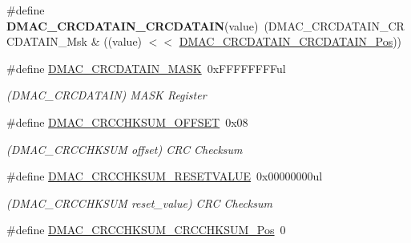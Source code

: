 \begin{DoxyCompactItemize}
\item 
\hypertarget{group___s_a_m_l21___d_m_a_c_ga6f7623c362034eb08c455c14471223a3}{}\#define {\bfseries D\+M\+A\+C\+\_\+\+C\+R\+C\+D\+A\+T\+A\+I\+N\+\_\+\+C\+R\+C\+D\+A\+T\+A\+I\+N}(value)~(D\+M\+A\+C\+\_\+\+C\+R\+C\+D\+A\+T\+A\+I\+N\+\_\+\+C\+R\+C\+D\+A\+T\+A\+I\+N\+\_\+\+Msk \& ((value) $<$$<$ \hyperlink{group___s_a_m_l21___d_m_a_c_ga2713a15a580d2050de8cc774fdd40e3d}{D\+M\+A\+C\+\_\+\+C\+R\+C\+D\+A\+T\+A\+I\+N\+\_\+\+C\+R\+C\+D\+A\+T\+A\+I\+N\+\_\+\+Pos}))\label{group___s_a_m_l21___d_m_a_c_ga6f7623c362034eb08c455c14471223a3}

\item 
\hypertarget{group___s_a_m_l21___d_m_a_c_ga6900758cea6fa34414c3928274381515}{}\#define \hyperlink{group___s_a_m_l21___d_m_a_c_ga6900758cea6fa34414c3928274381515}{D\+M\+A\+C\+\_\+\+C\+R\+C\+D\+A\+T\+A\+I\+N\+\_\+\+M\+A\+S\+K}~0x\+F\+F\+F\+F\+F\+F\+F\+Ful\label{group___s_a_m_l21___d_m_a_c_ga6900758cea6fa34414c3928274381515}

\begin{DoxyCompactList}\small\item\em (D\+M\+A\+C\+\_\+\+C\+R\+C\+D\+A\+T\+A\+I\+N) M\+A\+S\+K Register \end{DoxyCompactList}\item 
\hypertarget{group___s_a_m_l21___d_m_a_c_gaaf28d2e2f85065902296367f85cbf653}{}\#define \hyperlink{group___s_a_m_l21___d_m_a_c_gaaf28d2e2f85065902296367f85cbf653}{D\+M\+A\+C\+\_\+\+C\+R\+C\+C\+H\+K\+S\+U\+M\+\_\+\+O\+F\+F\+S\+E\+T}~0x08\label{group___s_a_m_l21___d_m_a_c_gaaf28d2e2f85065902296367f85cbf653}

\begin{DoxyCompactList}\small\item\em (D\+M\+A\+C\+\_\+\+C\+R\+C\+C\+H\+K\+S\+U\+M offset) C\+R\+C Checksum \end{DoxyCompactList}\item 
\hypertarget{group___s_a_m_l21___d_m_a_c_ga5a674aea99e5458c83f7d8c593158f57}{}\#define \hyperlink{group___s_a_m_l21___d_m_a_c_ga5a674aea99e5458c83f7d8c593158f57}{D\+M\+A\+C\+\_\+\+C\+R\+C\+C\+H\+K\+S\+U\+M\+\_\+\+R\+E\+S\+E\+T\+V\+A\+L\+U\+E}~0x00000000ul\label{group___s_a_m_l21___d_m_a_c_ga5a674aea99e5458c83f7d8c593158f57}

\begin{DoxyCompactList}\small\item\em (D\+M\+A\+C\+\_\+\+C\+R\+C\+C\+H\+K\+S\+U\+M reset\+\_\+value) C\+R\+C Checksum \end{DoxyCompactList}\item 
\hypertarget{group___s_a_m_l21___d_m_a_c_gae067bcd8b5d57e5e006ddd8d5bf1b619}{}\#define \hyperlink{group___s_a_m_l21___d_m_a_c_gae067bcd8b5d57e5e006ddd8d5bf1b619}{D\+M\+A\+C\+\_\+\+C\+R\+C\+C\+H\+K\+S\+U\+M\+\_\+\+C\+R\+C\+C\+H\+K\+S\+U\+M\+\_\+\+Pos}~0\label{group___s_a_m_l21___d_m_a_c_gae067bcd8b5d57e5e006ddd8d5bf1b619}


\end{DoxyCompactItemize}
